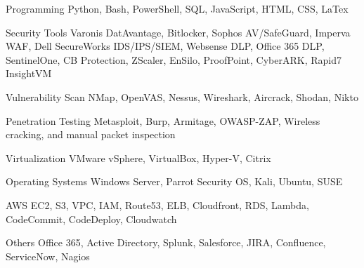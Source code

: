 
\begin{cvskills}
  \cvskill
    {Programming} %
    {Python, Bash, PowerShell, SQL, JavaScript, HTML, CSS, LaTex} %

  \cvskill
    {Security Tools} %
    {Varonis DatAvantage, Bitlocker, Sophos AV/SafeGuard, Imperva WAF, Dell SecureWorks IDS/IPS/SIEM, Websense DLP,\newline
    Office 365 DLP, SentinelOne, CB Protection, ZScaler, EnSilo, ProofPoint, CyberARK, Rapid7 InsightVM} %

  \cvskill
     {Vulnerability Scan} %
     {NMap, OpenVAS, Nessus, Wireshark, Aircrack, Shodan, Nikto} %
 
  \cvskill
     {Penetration Testing} %
     {Metasploit, Burp, Armitage, OWASP-ZAP, Wireless cracking, and manual packet inspection} %
 
  \cvskill
    {Virtualization} %
    {VMware vSphere, VirtualBox, Hyper-V, Citrix} %

  \cvskill
    {Operating Systems} %
    {Windows Server, Parrot Security OS, Kali, Ubuntu, SUSE} %

  \cvskill
    {AWS} %
    {EC2, S3, VPC, IAM, Route53, ELB, Cloudfront, RDS, Lambda, CodeCommit, CodeDeploy, Cloudwatch} %

  \cvskill
    {Others} %
    {Office 365, Active Directory, Splunk, Salesforce, JIRA, Confluence, ServiceNow, Nagios} %

\end{cvskills}
